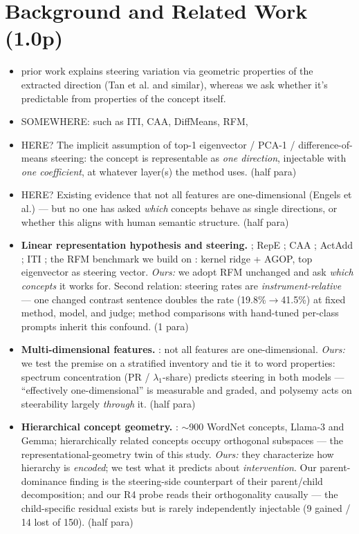 \documentclass[11pt]{article}
\newenvironment{outline}{\color{gray!70!black}\begin{itemize}[leftmargin=1.2em,itemsep=1pt]}{\end{itemize}\color{black}}
\begin{document}
\section{Background and Related Work (1.0p)}
\begin{outline}
  \item  prior work explains steering variation via geometric properties of the extracted direction (Tan et al. and similar), whereas we ask whether it's predictable from properties of the concept itself.
  \item SOMEWHERE: such as ITI, CAA, DiffMeans, RFM, 
  \item HERE? The implicit assumption of top-1 eigenvector / PCA-1 / difference-of-means steering: the concept is representable as \emph{one direction}, injectable with \emph{one coefficient}, at whatever layer(s) the method uses. (half para)
\item HERE? Existing evidence that not all features are one-dimensional (Engels et al.) --- but no one has asked \emph{which} concepts behave as single directions, or whether this aligns with human semantic structure. (half para)
\item \textbf{Linear representation hypothesis and steering.} \citet{park2024linear}; RepE \citep{zou2023repe}; CAA \citep{panickssery2024caa}; ActAdd \citep{turner2023actadd}; ITI \citep{li2023iti}; the RFM benchmark we build on \citep{beaglehole2025universal}: kernel ridge + AGOP, top eigenvector as steering vector. \emph{Ours:} we adopt RFM unchanged and ask \emph{which concepts} it works for. Second relation: steering rates are \emph{instrument-relative} --- one changed contrast sentence doubles the rate (19.8\%$\to$41.5\%) at fixed method, model, and judge; method comparisons with hand-tuned per-class prompts inherit this confound. (1 para)
\item \textbf{Multi-dimensional features.} \citet{engels2024notalllinear}: not all features are one-dimensional. \emph{Ours:} we test the premise on a stratified inventory and tie it to word properties: spectrum concentration (PR / $\lambda_1$-share) predicts steering in both models --- ``effectively one-dimensional'' is measurable and graded, and polysemy acts on steerability largely \emph{through} it. (half para)
\item \textbf{Hierarchical concept geometry.} \citet{park2025geometry}: $\sim$900 WordNet concepts, Llama-3 and Gemma; hierarchically related concepts occupy orthogonal subspaces --- the representational-geometry twin of this study. \emph{Ours:} they characterize how hierarchy is \emph{encoded}; we test what it predicts about \emph{intervention}. Our parent-dominance finding is the steering-side counterpart of their parent/child decomposition; and our R4 probe reads their orthogonality causally --- the child-specific residual exists but is rarely independently injectable (9 gained / 14 lost of 150). (half para)

\end{outline}
\end{document}
